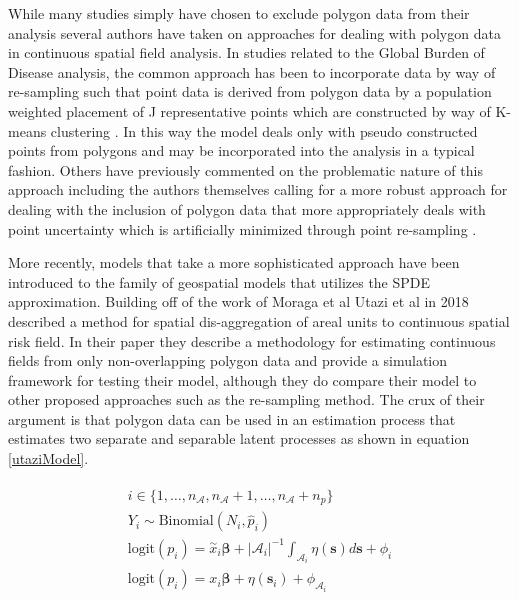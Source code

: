 \documentclass{article}
\begin{document}
While many studies simply have chosen to exclude polygon data from their analysis several authors have taken on approaches for dealing with polygon data in continuous spatial field analysis. In studies related to the Global Burden of Disease analysis, the common approach has been to incorporate data by way of re-sampling such that point data is derived from polygon data by a population weighted placement of J representative points which are constructed by way of K-means clustering \cite{Golding2017, Reiner2018}. In this way the model deals only with pseudo constructed points from polygons and may be incorporated into the analysis in a typical fashion. Others have previously commented on the problematic nature of this approach \cite{Wakefield2017} including the authors themselves calling for a more robust approach for dealing with the inclusion of polygon data that more appropriately deals with point uncertainty which is artificially minimized through point re-sampling \cite{Golding2017}.

More recently, models that take a more sophisticated approach have been introduced to the family of geospatial models that utilizes the SPDE approximation. Building off of the work of Moraga et al \cite{Moraga2017} Utazi et al in 2018 described a method for spatial dis-aggregation of areal units to continuous spatial risk field. In their paper they describe a methodology for estimating continuous fields from only non-overlapping polygon data and provide a simulation framework for testing their model, although they do compare their model to other proposed approaches such as the re-sampling method. The crux of their argument is that polygon data can be used in an estimation process that estimates two separate and separable latent processes as shown in equation \ref{utaziModel}.

\begin{align}\label{utaziModel}\begin{split}
    i \in \{1, \dots, n_{\mathcal{A}}, n_{\mathcal{A}} + 1, \dots, n_{\mathcal{A}} + n_p\}\\
    Y_i \sim \text{Binomial}(N_i, \hat{p}_i) \\
    \text{logit}(p_i) = \overset{\sim}{x}_i \boldsymbol{\beta} + |\mathcal{A}_i|^{-1} \int_{\mathcal{A}_i} \eta(\boldsymbol{s}) d\boldsymbol{s} + \phi_i \\
    \text{logit}(p_i) = x_i \boldsymbol{\beta} + \eta(\boldsymbol{s}_i) + \phi_{\mathcal{A}_i}
\end{split}\end{align}
\end{document}
